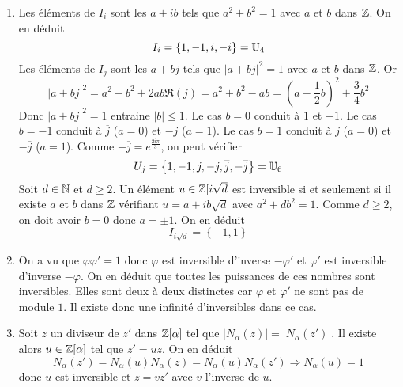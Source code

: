 \begin{enumerate}
\begin{enumerate}
    \item Les éléments de $I_i$ sont les $a+ib$ tels que $a^2+b^2=1$ avec $a$ et $b$ dans $\mathbb{Z}$. On en déduit
    \begin{displaymath}
      I_i = \left\lbrace 1, -1, i, -i\right\rbrace = \mathbb{U}_4 
    \end{displaymath}
Les éléments de $I_j$ sont les $a+bj$ tels que $|a+bj|^2=1$ avec $a$ et $b$ dans $\mathbb{Z}$. Or
\begin{displaymath}
  |a+bj|^2 = a^2 + b^2 +2ab\Re (j) = a^2+b^2-ab = (a-\frac{1}{2}b)^2 +\frac{3}{4}b^2
\end{displaymath}
Donc $|a+bj|^2 = 1$ entraine $|b|\leq 1$. Le cas $b=0$ conduit à $1$ et $-1$. Le cas $b=-1$ conduit à $\overline{j}$ ($a=0$) et $-j$ ($a=1$). Le cas $b=1$ conduit à $j$ ($a=0$) et $-\overline{j}$ ($a=1$). Comme $-\overline{j}=e^{\frac{2i\pi}{3}}$, on peut vérifier
\begin{displaymath}
  U_j = \left\lbrace 1, -1, j, -j, \overline{j}, -\overline{j}\right\rbrace = \mathbb{U}_6 
\end{displaymath}
Soit $d\in \mathbb{N}$ et $d\geq 2$. Un élément $u\in \mathbb{Z}[i\sqrt{d}$ est inversible si et seulement si il existe $a$ et $b$ dans $\mathbb{Z}$ vérifiant $u=a+ib\sqrt{d}$ avec $a^2 + db^2=1$. Comme $d\geq 2$, on doit avoir $b=0$ donc $a=\pm 1$. On en déduit
\begin{displaymath}
  I_{i\sqrt{d}} = \left\lbrace -1, 1\right\rbrace 
\end{displaymath}

    \item On a vu que $\varphi \varphi' = 1$ donc $\varphi$ est inversible d'inverse $-\varphi'$ et $\varphi'$ est inversible d'inverse $-\varphi$. On en déduit que toutes les puissances de ces nombres sont inversibles. Elles sont deux à deux distinctes car $\varphi$ et $\varphi'$ ne sont pas de module $1$. Il existe donc une infinité d'inversibles dans ce cas. 
    \item Soit $z$ un diviseur de $z'$ dans $\mathbb{Z}[\alpha]$ tel que $|N_{\alpha}(z)|=|N_{\alpha}(z')|$. Il existe alors $u\in \mathbb{Z}[\alpha]$ tel que $z'=uz$. On en déduit
    \begin{displaymath}
      N_{\alpha}(z') = N_{\alpha}(u) N_{\alpha}(z) = N_{\alpha}(u) N_{\alpha}(z')\Rightarrow N_{\alpha}(u)=1 
    \end{displaymath}
donc $u$ est inversible et $z=vz'$ avec $v$ l'inverse de $u$.
  \end{enumerate}


\end{enumerate}
